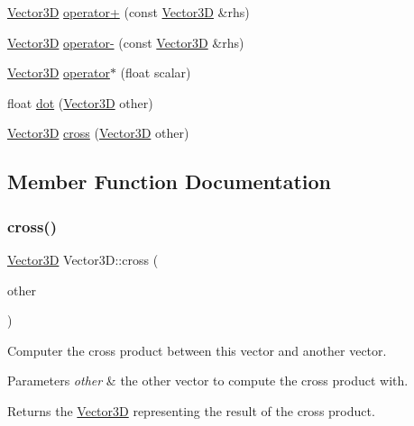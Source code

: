 \begin{DoxyCompactItemize}
\hyperlink{classVector3D}{Vector3D} \hyperlink{classVector3D_a9faa0ba77bc84f65fbde301ae4085ee9}{operator+} (const \hyperlink{classVector3D}{Vector3D} \&rhs)
\item 
\hyperlink{classVector3D}{Vector3D} \hyperlink{classVector3D_ac55913246c9f9d6bc5058e476977e260}{operator-\/} (const \hyperlink{classVector3D}{Vector3D} \&rhs)
\item 
\hyperlink{classVector3D}{Vector3D} \hyperlink{classVector3D_abfc0e53bd47939c99aec47831e3255e9}{operator$\ast$} (float scalar)
\item 
float \hyperlink{classVector3D_a8214f44353a8cef6b94062092581e976}{dot} (\hyperlink{classVector3D}{Vector3D} other)
\item 
\hyperlink{classVector3D}{Vector3D} \hyperlink{classVector3D_a0ddd32c1b0ac83d25bf6f99af473372e}{cross} (\hyperlink{classVector3D}{Vector3D} other)
\end{DoxyCompactItemize}


\subsection{Member Function Documentation}
\mbox{\label{classVector3D_a0ddd32c1b0ac83d25bf6f99af473372e}} 
\subsubsection{\texorpdfstring{cross()}{cross()}}
{\footnotesize\ttfamily \hyperlink{classVector3D}{Vector3D} Vector3\+D\+::cross (\begin{DoxyParamCaption}\item[{\hyperlink{classVector3D}{Vector3D}}]{other }\end{DoxyParamCaption})}

Computer the cross product between this vector and another vector.


\begin{DoxyParams}{Parameters}
{\em other} & the other vector to compute the cross product with. \\
\hline
\end{DoxyParams}
\begin{DoxyReturn}{Returns}
the \hyperlink{classVector3D}{Vector3D} representing the result of the cross product. 
\end{DoxyReturn}
\mbox{\label{classVector3D_a8214f44353a8cef6b94062092581e976}} 
